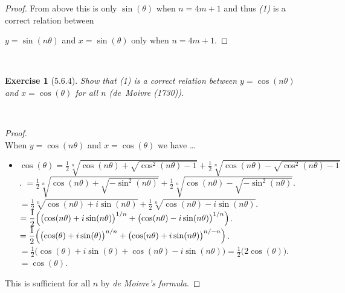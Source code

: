 \documentclass[12pt]{article}
\newcommand{\XB}{\color{black}}
\newcommand{\XBB}{\color{blue}}
\newcommand{\ds}{\displaystyle}
\theoremstyle{plain}
\newtheorem{ex}{Exercise}
\begin{document}
\begin{proof}
  From above this is only $ \sin(\theta) $ when  $ n = 4m + 1 $ and thus \textit{(1)} is a correct relation between

  $ y = \sin(n\theta) $ and $ x = \sin(\theta) $ only when $ n = 4m + 1 $.

\end{proof}

\newpage


\XBB\hrulefill\XB \\
\begin{ex} [5.6.4]
  Show that (1) is a correct relation between $ y = \cos(n\theta) $ and $ x = \cos(\theta) $ for all $ n $ (de~Moivre (1730)).
\end{ex}
\XBB\hrulefill\XB \\

\begin{proof}
  \ \\

  When $ y = \cos(n\theta) $ and $ x = \cos(\theta) $ we have \dots
  \begin{itemize}
    \item $ \ds \cos(\theta) = \frac{1}{2} \sqrt[n]{ \ds \cos(n\theta) + \sqrt{ \cos^{2}(n\theta) - 1 } } + \frac{1}{2} \sqrt[n]{ \ds \cos(n\theta) - \sqrt{ \cos^{2}(n\theta) - 1 } } $.
    \subitem $ \ds = \frac{1}{2} \sqrt[n]{ \ds \cos(n\theta) + \sqrt{ - \sin^{2}(n\theta) } } + \frac{1}{2} \sqrt[n]{ \ds \cos(n\theta) - \sqrt{ - \sin^{2}(n\theta) } } $.
    \subitem $ \ds = \frac{1}{2} \sqrt[n]{ \ds \cos(n\theta) + i\sin(n\theta) } + \frac{1}{2} \sqrt[n]{ \ds \cos(n\theta) - i\sin(n\theta) } $.
    \subitem $ \ds = \frac{1}{2} \Bigl( \bigl( \cos(n\theta) + i\sin(n\theta) \bigr)^{1/n} + \bigl( \cos(n\theta) - i\sin(n\theta) \bigr)^{1/n} \Bigr) $.
    \subitem $ \ds = \frac{1}{2} \Bigl( \bigl( \cos(\theta) + i\sin(\theta) \bigr)^{n/n} + \bigl( \cos(n\theta) + i\sin(n\theta) \bigr)^{n/-n} \Bigr) $.
    \subitem $ \ds = \frac{1}{2} \bigl( \cos(\theta) + i\sin(\theta) + \cos(n\theta) - i\sin(n\theta) \bigr) = \frac{1}{2} \bigl( 2\cos(\theta) \bigr) $.
    \subitem $ \ds = \cos(\theta) $.
  \end{itemize}

  This is sufficient for all $ n $ by \textit{de Moivre's formula}.

\end{proof}

\newpage
\end{document}
